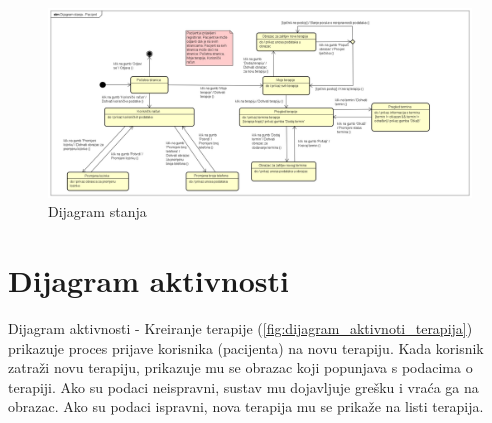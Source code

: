 			\begin{figure}[H]
				\includegraphics[scale=0.3]{slike/Dijagram stanja - Pacijent.PNG} %
				\centering
				\caption{Dijagram stanja}
				\label{fig:dijagram_stanja1}
			\end{figure}
			
			
			\eject 
		
		\section{Dijagram aktivnosti}
		
			

Dijagram aktivnosti - Kreiranje terapije (\ref{fig:dijagram_aktivnoti_terapija}) prikazuje proces prijave korisnika (pacijenta) na novu terapiju. Kada korisnik zatraži novu terapiju, prikazuje mu se obrazac koji popunjava s podacima o terapiji. Ako su podaci neispravni, sustav mu dojavljuje grešku i vraća ga na obrazac. Ako su podaci ispravni, nova terapija mu se prikaže na listi terapija. 

